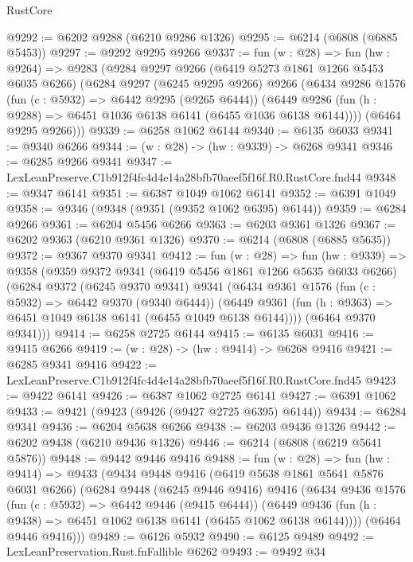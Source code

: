 \begin{lexlean}{RustCore}
\begin{coremodule}
@9292 := @6202 @9288 (@6210 @9286 @1326)
@9295 := @6214 (@6808 (@6885 @5453))
@9297 := @9292 @9295 @9266
@9337 := fun (w : @28) =>
  fun (hw : @9264) =>
  @9283
    (@9284
      @9297
      @9266
      (@6419 @5273 @1861 @1266 @5453 @6035 @6266)
      (@6284
        @9297
        (@6245 @9295 @9266)
        @9266
        (@6434
          @9286
          @1576
          (fun (c : @5932) => @6442 @9295 (@9265 @6444))
          (@6449 @9286 (fun (h : @9288) => @6451 @1036 @6138 @6141 (@6455 @1036 @6138 @6144))))
        (@6464 @9295 @9266)))
@9339 := @6258 @1062 @6144
@9340 := @6135 @6033
@9341 := @9340 @6266
@9344 := (w : @28) -> (hw : @9339) -> @6268 @9341
@9346 := @6285 @9266 @9341
@9347 := LexLeanPreserve.C1b912f4fc4d4e14a28bfb70aeef5f16f.R0.RustCore.fnd44
@9348 := @9347 @6141
@9351 := @6387 @1049 @1062 @6141
@9352 := @6391 @1049
@9358 := @9346 (@9348 (@9351 (@9352 @1062 @6395) @6144))
@9359 := @6284 @9266
@9361 := @6204 @5456 @6266
@9363 := @6203 @9361 @1326
@9367 := @6202 @9363 (@6210 @9361 @1326)
@9370 := @6214 (@6808 (@6885 @5635))
@9372 := @9367 @9370 @9341
@9412 := fun (w : @28) =>
  fun (hw : @9339) =>
  @9358
    (@9359
      @9372
      @9341
      (@6419 @5456 @1861 @1266 @5635 @6033 @6266)
      (@6284
        @9372
        (@6245 @9370 @9341)
        @9341
        (@6434
          @9361
          @1576
          (fun (c : @5932) => @6442 @9370 (@9340 @6444))
          (@6449 @9361 (fun (h : @9363) => @6451 @1049 @6138 @6141 (@6455 @1049 @6138 @6144))))
        (@6464 @9370 @9341)))
@9414 := @6258 @2725 @6144
@9415 := @6135 @6031
@9416 := @9415 @6266
@9419 := (w : @28) -> (hw : @9414) -> @6268 @9416
@9421 := @6285 @9341 @9416
@9422 := LexLeanPreserve.C1b912f4fc4d4e14a28bfb70aeef5f16f.R0.RustCore.fnd45
@9423 := @9422 @6141
@9426 := @6387 @1062 @2725 @6141
@9427 := @6391 @1062
@9433 := @9421 (@9423 (@9426 (@9427 @2725 @6395) @6144))
@9434 := @6284 @9341
@9436 := @6204 @5638 @6266
@9438 := @6203 @9436 @1326
@9442 := @6202 @9438 (@6210 @9436 @1326)
@9446 := @6214 (@6808 (@6219 @5641 @5876))
@9448 := @9442 @9446 @9416
@9488 := fun (w : @28) =>
  fun (hw : @9414) =>
  @9433
    (@9434
      @9448
      @9416
      (@6419 @5638 @1861 @5641 @5876 @6031 @6266)
      (@6284
        @9448
        (@6245 @9446 @9416)
        @9416
        (@6434
          @9436
          @1576
          (fun (c : @5932) => @6442 @9446 (@9415 @6444))
          (@6449 @9436 (fun (h : @9438) => @6451 @1062 @6138 @6141 (@6455 @1062 @6138 @6144))))
        (@6464 @9446 @9416)))
@9489 := @6126 @5932
@9490 := @6125 @9489
@9492 := LexLeanPreservation.Rust.fnFallible @6262
@9493 := @9492 @34

\end{coremodule}
\end{lexlean}
